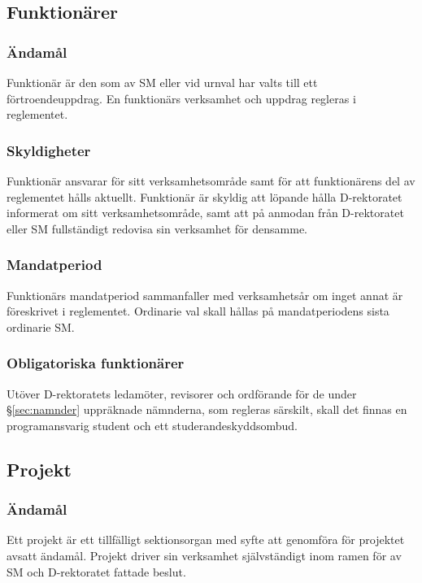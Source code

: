 \documentclass{dgovdoc}
\begin{document}
\subsection{Funktionärer}

\subsubsection{Ändamål}

Funktionär är den som av SM eller vid urnval har valts till ett
förtroendeuppdrag. En funktionärs verksamhet och uppdrag regleras i
reglementet.

\subsubsection{Skyldigheter}

Funktionär ansvarar för sitt verksamhetsområde samt för att funktionärens del
av reglementet hålls aktuellt. Funktionär är skyldig att löpande hålla
D-rektoratet informerat om sitt verksamhetsområde, samt att på anmodan från
D-rektoratet eller SM fullständigt redovisa sin verksamhet för densamme.

\subsubsection{Mandatperiod}

Funktionärs mandatperiod sammanfaller med verksamhetsår om inget annat är
föreskrivet i reglementet. Ordinarie val skall hållas på mandatperiodens sista
ordinarie SM.

\subsubsection{Obligatoriska funktionärer}

Utöver D-rektoratets ledamöter, revisorer och ordförande för de under
\S\ref{sec:namnder} uppräknade nämnderna, som regleras särskilt, skall det
finnas en programansvarig student och ett studerandeskyddsombud.

\subsection{Projekt}

\subsubsection{Ändamål}

Ett projekt är ett tillfälligt sektionsorgan med syfte att genomföra för
projektet avsatt ändamål. Projekt driver sin verksamhet självständigt inom
ramen för av SM och D-rektoratet fattade beslut.
\end{document}
